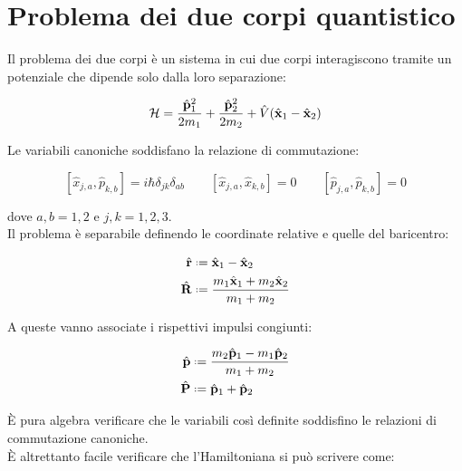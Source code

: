 \section{Problema dei due corpi quantistico}

Il problema dei due corpi è un sistema in cui due corpi interagiscono tramite un potenziale che dipende solo dalla loro separazione:

\begin{equation}
	\mathcal{H} = \frac{\hat{\mathbf{p}}_1^2}{2m_1} + \frac{\hat{\mathbf{p}}_2^2}{2m_2} + \hat{V}(\hat{\mathbf{x}}_1 - \hat{\mathbf{x}}_2)
	\label{eq:17}
\end{equation}

Le variabili canoniche soddisfano la relazione di commutazione:

\begin{equation}
	\left[\hat{x}_{j,a}, \hat{p}_{k,b}\right] = i\hbar \delta_{jk} \delta_{ab} \qquad \left[\hat{x}_{j,a}, \hat{x}_{k,b}\right] = 0 \qquad \left[\hat{p}_{j,a}, \hat{p}_{k,b}\right] = 0
	\label{eq:18}
\end{equation}

dove $ a,b = 1,2 $ e $ j,k = 1,2,3 $.\\
%
Il problema è separabile definendo le coordinate relative e quelle del baricentro:

\begin{equation}
	\begin{split}
		\hat{\ve{r}} &\defeq \hat{\ve{x}}_1 - \hat{\ve{x}}_2\\
		\hat{\ve{R}} &\defeq \frac{m_1 \hat{\ve{x}}_1 + m_2 \hat{\ve{x}}_2}{m_1 + m_2}
	\end{split}
	\label{eq:19}
\end{equation}

A queste vanno associate i rispettivi impulsi congiunti:

\begin{equation}
	\begin{split}
		\hat{\ve{p}} &\defeq \frac{m_2 \hat{\ve{p}}_1 - m_1 \hat{\ve{p}}_2}{m_1 + m_2}\\
		\hat{\ve{P}} &\defeq \hat{\ve{p}}_1 + \hat{\ve{p}}_2
	\end{split}
	\label{eq:20}
\end{equation}

È pura algebra verificare che le variabili così definite soddisfino le relazioni di commutazione canoniche.\\
È altrettanto facile verificare che l'Hamiltoniana si può scrivere come:

